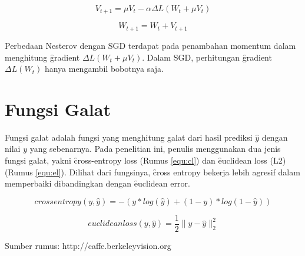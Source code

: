 \begin{equation}
\label{equ:nesterov}
V_{t+1}=\mu V_{t} - \alpha\Delta L(W_{t} + \mu V_{t})
\end{equation}

\begin{equation}
W_{t+1} = W_{t} + V_{t+1}
\end{equation}

Perbedaan Nesterov dengan SGD terdapat pada penambahan momentum dalam menghitung \f{gradient} $\Delta L(W_{t} + \mu V_{t})$. Dalam SGD, perhitungan \f{gradient} $\Delta L(W_{t})$ hanya mengambil bobotnya saja.

\section{Fungsi Galat}
Fungsi galat adalah fungsi yang menghitung galat dari hasil prediksi $\hat{y}$ dengan nilai $y$ yang sebenarnya. Pada penelitian ini, penulis menggunakan dua jenis fungsi galat, yakni \f{cross-entropy loss} (Rumus \ref{equ:cl}) dan \f{euclidean loss} (L2) (Rumus \ref{equ:el}). Dilihat dari fungsinya, \f{cross entropy} bekerja lebih agresif dalam memperbaiki dibandingkan dengan \f{euclidean error}.

\begin{equation}
\label{equ:cl}
crossentropy(y, \hat{y}) = -(y * log(\hat{y}) + (1 - y) * log(1 - \hat{y}))
\end{equation}

\begin{equation}
\label{equ:el}
euclideanloss(y, \hat{y}) = \frac{1}{2} \|y - \hat{y}\|^{2}_{2}
\end{equation}
\begin{center}
	{\small Sumber rumus: http://caffe.berkeleyvision.org}
\end{center}
